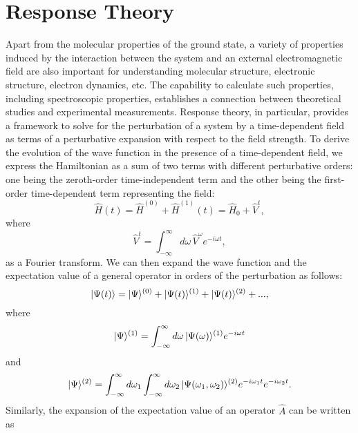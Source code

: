 \section{Response Theory}\label{response}
Apart from the molecular properties of the ground state, a variety of properties induced by the interaction between the system and an external electromagnetic field are also important for understanding molecular structure, electronic structure, electron dynamics, etc.\cite{English2015, Stuyver2020} The capability to calculate such properties, including spectroscopic properties, establishes a connection between theoretical studies and experimental measurements. Response theory, in particular, provides a framework to solve for the perturbation of a system by a time-dependent field as terms of a perturbative expansion with respect to the field strength.\cite{Norman2011, Helgaker2012} To derive the evolution of the wave function in the presence of a time-dependent field, we express the Hamiltonian as a sum of two terms with different perturbative orders: one being the zeroth-order time-independent term and the other being the first-order time-dependent term representing the field:
\begin{equation}
\hat{H}(t) = \hat{H}^{(0)} +  \hat{H}^{(1)}(t) = \hat{H}_{0} + \hat{V}^{t},
\label{eq:response-h}
\end{equation}
where
\begin{equation}
\hat{V}^{t} = \int_{-\infty}^{\infty} d\omega \, \hat{V}^{\omega}e^{-i\omega t},
\label{eq:response-V}
\end{equation}
as a Fourier transform.\cite{Bracewell1989} We can then expand the wave function and the expectation value of a general operator in orders of the perturbation as follows: 
\begin{equation}
| \Psi(t) \rangle = | \Psi \rangle^{(0)} +  | \Psi(t) \rangle^{(1)} +  | \Psi(t) \rangle^{(2)} + ...,
\end{equation}
where 
\begin{equation}
| \Psi \rangle^{(1)} = \int_{-\infty}^{\infty} d\omega \,  | \Psi(\omega) \rangle^{(1)}e^{-i\omega t}
\end{equation}
and
\begin{equation}
| \Psi \rangle^{(2)}  = \int_{-\infty}^{\infty} d\omega_{1} \int_{-\infty}^{\infty} d\omega_{2} \, 
                            | \Psi(\omega_{1}, \omega_{2}) \rangle^{(2)}e^{-i\omega_{1} t}e^{-i\omega_{2} t}.
\end{equation}
Similarly, the expansion of the expectation value of an operator $\hat{A}$ can be written as
